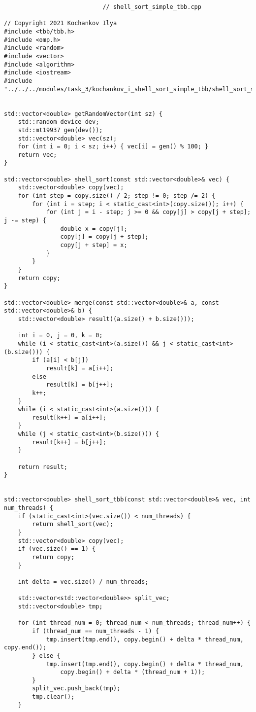 \documentclass{report}
\begin{document}
\begin{lstlisting}
							// shell_sort_simple_tbb.cpp

// Copyright 2021 Kochankov Ilya
#include <tbb/tbb.h>
#include <omp.h>
#include <random>
#include <vector>
#include <algorithm>
#include <iostream>
#include "../../../modules/task_3/kochankov_i_shell_sort_simple_tbb/shell_sort_simple_tbb.h"


std::vector<double> getRandomVector(int sz) {
    std::random_device dev;
    std::mt19937 gen(dev());
    std::vector<double> vec(sz);
    for (int i = 0; i < sz; i++) { vec[i] = gen() % 100; }
    return vec;
}

std::vector<double> shell_sort(const std::vector<double>& vec) {
    std::vector<double> copy(vec);
    for (int step = copy.size() / 2; step != 0; step /= 2) {
        for (int i = step; i < static_cast<int>(copy.size()); i++) {
            for (int j = i - step; j >= 0 && copy[j] > copy[j + step]; j -= step) {
                double x = copy[j];
                copy[j] = copy[j + step];
                copy[j + step] = x;
            }
        }
    }
    return copy;
}

std::vector<double> merge(const std::vector<double>& a, const std::vector<double>& b) {
    std::vector<double> result((a.size() + b.size()));

    int i = 0, j = 0, k = 0;
    while (i < static_cast<int>(a.size()) && j < static_cast<int>(b.size())) {
        if (a[i] < b[j])
            result[k] = a[i++];
        else
            result[k] = b[j++];
        k++;
    }
    while (i < static_cast<int>(a.size())) {
        result[k++] = a[i++];
    }
    while (j < static_cast<int>(b.size())) {
        result[k++] = b[j++];
    }

    return result;
}


std::vector<double> shell_sort_tbb(const std::vector<double>& vec, int num_threads) {
    if (static_cast<int>(vec.size()) < num_threads) {
        return shell_sort(vec);
    }
    std::vector<double> copy(vec);
    if (vec.size() == 1) {
        return copy;
    }

    int delta = vec.size() / num_threads;

    std::vector<std::vector<double>> split_vec;
    std::vector<double> tmp;

    for (int thread_num = 0; thread_num < num_threads; thread_num++) {
        if (thread_num == num_threads - 1) {
            tmp.insert(tmp.end(), copy.begin() + delta * thread_num, copy.end());
        } else {
            tmp.insert(tmp.end(), copy.begin() + delta * thread_num,
                copy.begin() + delta * (thread_num + 1));
        }
        split_vec.push_back(tmp);
        tmp.clear();
    }


\end{lstlisting}
\end{document}

